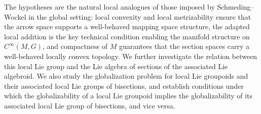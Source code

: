 \documentclass[12pt,a4paper]{amsart}
\theoremstyle{plain}
\theoremstyle{definition}
\begin{document}
The hypotheses are the natural local analogues of those imposed by Schmeding--Wockel in the global setting: local convexity and local metrizability ensure that the arrow space supports a well-behaved mapping space structure, the adapted local addition is the key technical condition enabling the manifold structure on \(C^\infty(M,G)\), and compactness of \(M\) guarantees that the section spaces carry a well-behaved locally convex topology.
We further investigate the relation between this local Lie group and the Lie algebra of sections of the associated Lie algebroid. We also study the globalization problem for local Lie groupoids and their associated local Lie groups of bisections, and establish conditions under which the globalizability of a local Lie groupoid implies the globalizability of its associated local Lie group of bisections, and vice versa.
\end{document}
